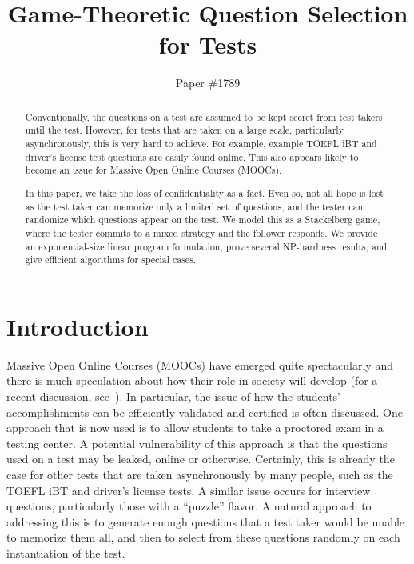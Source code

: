 \documentclass{article}
\title{Game-Theoretic Question Selection for Tests}
\author{Paper \#1789}
\begin{document}
\maketitle

\begin{abstract}
Conventionally, the questions on a test are assumed to be kept secret
from test takers until the test.  However, for tests that are taken on
a large scale, particularly asynchronously, this is very hard to
achieve.  For example, example TOEFL iBT and driver's license test
questions are easily found online.  This also appears likely to become
an issue for Massive Open Online Courses (MOOCs).

In this paper, we take the loss of confidentiality as a fact.  Even
so, not all hope is lost as the test taker can memorize only a limited
set of questions, and the tester can randomize which questions appear on
the test.  We model this as a Stackelberg game, where the tester
commits to a mixed strategy and the follower responds.  We provide an
exponential-size linear program formulation, prove several NP-hardness
results, and give efficient algorithms for special cases.
\end{abstract}

\section{Introduction}
Massive Open Online Courses (MOOCs) have emerged quite spectacularly
and there is much speculation about how their role in society will
develop (for a recent discussion, see~\cite{Cooper13:Reflections}).
In particular, the issue of how the students' accomplishments can be
efficiently validated and certified is often discussed.  One approach
that is now used is to allow students to take a proctored exam in a
testing center.  A potential vulnerability of this approach is that
the questions used on a test may be leaked, online or otherwise.
Certainly, this is already the case for other tests that are taken
asynchronously by many people, such as the TOEFL iBT and driver's
license tests.  A similar issue occurs for interview questions,
particularly those with a ``puzzle'' flavor.  A natural approach to
addressing this is to generate enough questions that a test taker
would be unable to memorize them all, and then to select from these
questions randomly on each instantiation of the test.
\end{document}
